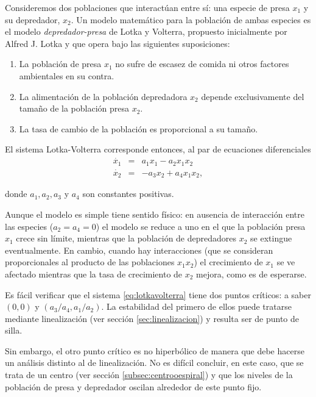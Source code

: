 \begin{example}\label{ex:lotkavolterra}

Consideremos dos poblaciones que interactúan entre sí: una especie de presa $x_1$ y su depredador, $x_2$. Un modelo matemático para la población de ambas especies es el modelo \emph{depredador-presa} de Lotka y Volterra, propuesto inicialmente por Alfred J. Lotka \cite{lotka10,lotka25,volterra} y que opera bajo las siguientes suposiciones:

\begin{enumerate}
	\item La población de presa $x_1$ no sufre de escasez de comida ni otros factores ambientales en su contra.
	\item La alimentación de la población depredadora $x_2$ depende exclusivamente del tamaño de la población presa $x_2$.
	\item La tasa de cambio de la población es proporcional a su tamaño.
\end{enumerate}

El sistema Lotka-Volterra corresponde entonces, al par de ecuaciones diferenciales
\begin{equation} \label{eq:lotkavolterra}
	\begin{array}{lll}
		\dot{x_1} & = & a_1x_1 - a_2x_1x_2 \\
		\dot{x_2} & = & -a_3x_2 + a_4x_1x_2,
	\end{array}
\end{equation}

donde $a_1, a_2, a_3$ y $a_4$ son constantes positivas.

Aunque el modelo es simple tiene sentido físico: en ausencia de interacción entre las especies ($a_2 = a_4 = 0$) el modelo se reduce a uno en el que la población presa $x_1$ crece sin límite, mientras que la población de depredadores $x_2$ se extingue eventualmente.
En cambio, cuando hay interacciones (que se consideran proporcionales al producto de las poblaciones $x_1x_2$) el crecimiento de $x_1$ se ve afectado mientras que la tasa de crecimiento de $x_2$ mejora, como es de esperarse.

Es fácil verificar que el sistema \ref{eq:lotkavolterra} tiene dos puntos críticos: a saber $(0,0)$ y $(a_3 / a_4, a_1 / a_2)$.
La estabilidad del primero de ellos puede tratarse mediante linealización (ver sección \ref{sec:linealizacion}) y resulta ser de punto de silla.

Sin embargo, el otro punto crítico es no hiperbólico de manera que debe hacerse un análisis distinto al de linealización. No es difícil concluir, en este caso, que se trata de un centro (ver sección \ref{subsec:centrooespiral}) y que los niveles de la población de presa y depredador oscilan alrededor de este punto fijo.


\end{example}
